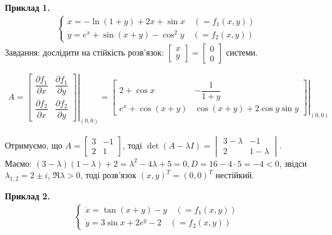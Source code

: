\documentclass[14pt,a4paper]{scrartcl}
\theoremstyle{definition}
\theoremstyle{definition}
\theoremstyle{definition}
\begin{document}
\textbf{Приклад 1.}
\begin{gather*}
  \begin{cases}
     \dot{x} = -\ln(1+y) + 2x + \sin x \quad  (=f_1(x, y))\\
     \dot{y} = e^x + \sin(x+y) - \cos^2y \quad (=f_2(x, y))
  \end{cases}
\end{gather*}
Завдання: дослідити на стійкість розв'язок: $\begin{bmatrix} x \\ y \end{bmatrix} = \begin{bmatrix} 0 \\ 0 \end{bmatrix}$ системи.
\begin{spacing}{2.5}
\begin{gather*}
  A = \left. \begin{bmatrix}
    \dfrac{\partial f_1}{\partial x}   &   \dfrac{\partial f_1}{\partial y} \\
    \dfrac{\partial f_2}{\partial x}   &   \dfrac{\partial f_2}{\partial y}
  \end{bmatrix} \right|_{(0,0)} =
  \left. \begin{bmatrix}
   2 + \cos x &  -\dfrac{1}{1+y} \\
   e^x + \cos(x+y)  &  \cos(x+y) + 2\cos{y}\sin{y}
 \end{bmatrix} \right|_{(0,0)}
\end{gather*}
\end{spacing}
Отримуємо, що $A = \begin{bmatrix} 3 & -1 \\ 2 & 1\end{bmatrix}$, тоді $\det(A - \lambda I) =  \begin{vmatrix} 3 - \lambda & -1 \\ 2 & 1 - \lambda \end{vmatrix}$. \\
Маємо: $(3 - \lambda)(1 - \lambda) + 2 = \lambda^2 - 4\lambda + 5 = 0, D = 16 - 4 \cdot 5 = -4 < 0$, звідси $\lambda_{1, 2} = 2 \pm i$, $\Re \lambda > 0$, тоді розв'язок $(x, y)^T = (0, 0)^T $ нестійкий.

\textbf{Приклад 2.}
\begin{gather*}
  \begin{cases}
     \dot{x} = \tan(x+y) - y \quad  (=f_1(x, y))\\
     \dot{y} = 3\sin{x} + 2e^y - 2 \quad (=f_2(x, y))
  \end{cases}
\end{gather*}
\end{document}
